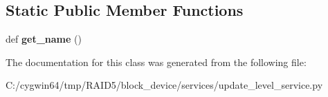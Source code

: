 \subsection*{Static Public Member Functions}
\begin{DoxyCompactItemize}
\item 
\mbox{\label{class_r_a_i_d5_1_1block__device_1_1services_1_1update__level__service_1_1_update_level_service_a3b15a64a007c7091c62be54243ddf44a}} 
def {\bfseries get\+\_\+name} ()
\end{DoxyCompactItemize}


The documentation for this class was generated from the following file\+:\begin{DoxyCompactItemize}
\item 
C\+:/cygwin64/tmp/\+R\+A\+I\+D5/block\+\_\+device/services/update\+\_\+level\+\_\+service.\+py\end{DoxyCompactItemize}
